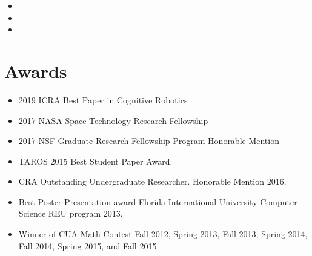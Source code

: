 \documentclass[11pt,a4paper,sans]{moderncv}        %
\begin{document}
\vspace{3pt}

\begin{itemize}

\item{}

\item{}  %
\item{}

\end{itemize}


\section{Awards}

\vspace{6pt}

\begin{itemize}

\item{2019 ICRA Best Paper in Cognitive Robotics}

\vspace{6pt}

\item{2017 NASA Space Technology Research Fellowship}

\vspace{6pt}

\item{2017 NSF Graduate Research Fellowship Program Honorable Mention}

\vspace{6pt}

\item{TAROS 2015 Best Student Paper Award.}

\vspace{6pt}

\item{CRA Outstanding Undergraduate Researcher.  Honorable Mention 2016.}

\vspace{6pt}

\item{Best Poster Presentation award Florida International University Computer Science REU program 2013.}

\vspace{6pt}

\item{Winner of CUA Math Contest Fall 2012, Spring 2013, Fall 2013, Spring 2014, Fall 2014, Spring 2015, and Fall 2015}

\end{itemize}
\end{document}
